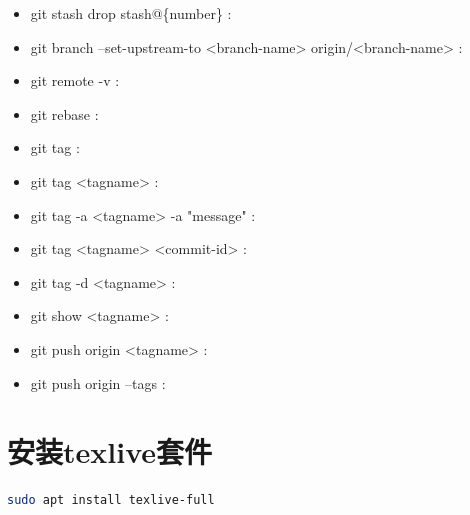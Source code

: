 \documentclass[12pt,twoside]{report}
\begin{document}
\begin{leftbar}
\begin{itemize}
        \item git stash drop stash@\{number\} :
        \item git branch --set-upstream-to <branch-name> origin/<branch-name> :
        \item git remote -v :
        \item git rebase :
        \item git tag :
        \item git tag <tagname> :
        \item git tag -a <tagname> -a "message" :
        \item git tag <tagname> <commit-id> :
        \item git tag -d <tagname> :
        \item git show <tagname> :
        \item git push origin <tagname> :
        \item git push origin --tags :
    \end{itemize}
\end{leftbar}


\section{安装texlive套件}
\begin{lstlisting}[language=sh]
    sudo apt install texlive-full
\end{lstlisting}
\end{document}
